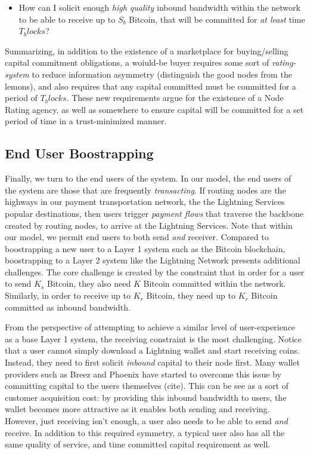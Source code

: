 \documentclass[12pt,a4paper]{article}
\theoremstyle{definition}
\begin{document}
\begin{itemize}
        \item How can I solicit enough \emph{high quality} inbound bandwidth
            within the network to be able to receive up to $S_b$ Bitcoin, that
            will be committed for \emph{at least} time $T_blocks$? 
\end{itemize} 

Summarizing, in addition to the existence of a marketplace for buying/selling
capital commitment obligations, a woiuld-be buyer requires some sort of
\emph{rating-system} to reduce information asymmetry (distinguish the good
nodes from the lemons), and also requires that any capital committed must be
committed for a period of $T_blocks$. These new requirements argue for the
existence of a Node Rating agency, as well as somewhere to ensure capital will
be committed for a set period of time in a trust-minimized manner. 


\subsection{End User Boostrapping}

Finally, we turn to the end users of the system. In our model, the end users of
the system are those that are frequently \emph{transacting}. If routing nodes
are the highways in our payment transportation network, the the Lightning
Services popular destinations, then users trigger \emph{payment flows} that
traverse the backbone created by routing nodes, to arrive at the Lightning
Services. Note that within our model, we permit end users to both send
\emph{and} receiver. Compared to boostrapping a new user to a Layer 1 system
such as the Bitcoin blockchain, boostrapping to a Layer 2 system like the
Lightning Network presents additional challenges. The core challenge is created
by the constraint that in order for a user to send $K_s$ Bitcoin, they also
need $K$ Bitcoin committed within the network. Similarly, in order to receive
up to $K_r$ Bitcoin, they need up to $K_r$ Bitcoin committed as inbound
bandwidth. 

From the perspective of attempting to achieve a similar level of
user-experience as a base Layer 1 system, the receiving constraint is the most
challenging. Notice that a user cannot simply download a Lightning wallet and
start receiving coins. Instead, they need to first solicit \emph{inbound}
capital to their node first. Many wallet providers such as Breez and Phoenix
have started to overcome this issue by committing capital to the users
themselves (cite). This can be see as a sort of customer acquisition cost: by
providing this inbound bandwidth to users, the wallet becomes more attractive
as it enables both sending and receiving. However, just receiving isn't enough,
a user also needs to be able to send \emph{and} receive. In addition to this
required symmetry, a typical user also has all the same quality of service, and
time committed capital requirement as well. 
\end{document}
